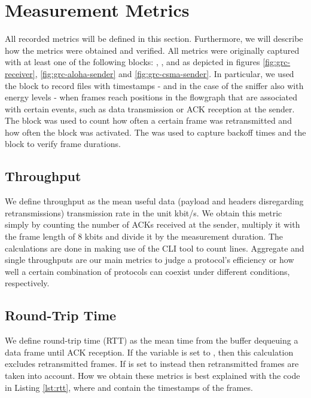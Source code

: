 \clearpage

\section{Measurement Metrics}
\label{sec:measurement-metrics}

All recorded metrics will be defined in this section. Furthermore, we will describe how the metrics were obtained and verified. All metrics were originally captured with at least one of the following blocks: , ,  and  as depicted in figures \ref{fig:grc-receiver}, \ref{fig:grc-aloha-sender} and \ref{fig:grc-csma-sender}. In particular, we used the  block to record files with timestamps - and in the case of the sniffer also with energy levels - when frames reach positions in the flowgraph that are associated with certain events, such as data transmission or ACK reception at the sender. The  block was used to count how often a certain frame was retransmitted and how often the  block was activated. The  was used to capture backoff times and the  block to verify frame durations.

\subsection{Throughput}

We define throughput as the mean useful data (payload and headers disregarding retransmissions) transmission rate in the unit kbit/s. We obtain this metric simply by counting the number of ACKs received at the sender, multiply it with the frame length of 8 kbits and divide it by the measurement duration. The calculations are done in  making use of the CLI tool  to count lines. Aggregate and single throughputs are our main metrics to judge a protocol's efficiency or how well a certain combination of protocols can coexist under different conditions, respectively.

\subsection{Round-Trip Time}
\label{sec:rtt}

We define round-trip time (RTT) as the mean time from the buffer dequeuing a data frame until ACK reception. If the variable  is set to , then this calculation excludes retransmitted frames. If  is set to  instead then retransmitted frames are taken into account. How we obtain these metrics is best explained with the code in Listing \ref{lst:rtt}, where  and  contain the timestamps of the frames. 

